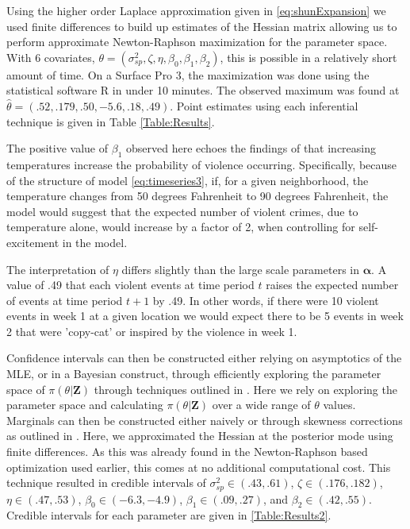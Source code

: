 \documentclass[11pt]{isuthesis}
\begin{document}
	Using the higher order Laplace approximation given in \eqref{eq:shunExpansion} we used finite differences to build up estimates of the Hessian matrix allowing us to perform approximate Newton-Raphson maximization for the parameter space.  With 6 covariates, $\theta = (\sigma_{sp}^2,\zeta,\eta,\beta_0,\beta_1,\beta_2)$, this is possible in a relatively short amount of time.  On a Surface Pro 3, the maximization was done using the statistical software R in under 10 minutes.  The observed maximum was found at $\hat{\theta}=(.52,.179,.50,-5.6,.18,.49)$.  Point estimates using each inferential technique is given in Table \ref{Table:Results}. 
	
	The positive value of $\beta_1$ observed here echoes the findings of \cite{anderson1987temperature} that increasing temperatures increase the probability of violence occurring.  Specifically, because of the structure of model \eqref{eq:timeseries3}, 
	if, for a given neighborhood, the temperature changes from 50 degrees Fahrenheit to 90 degrees Fahrenheit, the model would suggest that the expected number of violent crimes, due to temperature alone, would increase by a factor of 2, when controlling for self-excitement in the model.  
	
	The interpretation of $\eta$ differs slightly than the large scale parameters in $\boldsymbol{\alpha}$.  A value of .49 that each violent events at time period $t$ raises the expected number of events at time period $t+1$ by .49.  In other words, if there were 10 violent events in week 1 at a given location we would expect there to be 5 events in week 2 that were 'copy-cat' or inspired by the violence in week 1.
	
	Confidence intervals can then be constructed either relying on asymptotics of the MLE, or in a Bayesian construct, through efficiently exploring the parameter space of $\pi(\theta|\boldsymbol{Z})$ through techniques outlined in \cite{rue2009approximate}.  Here we rely on exploring the parameter space and calculating $\pi(\theta|\boldsymbol{Z})$ over a wide range of $\theta$ values.  Marginals can then be constructed either naively or through skewness corrections as outlined in \cite{martins2013bayesian}.  Here, we approximated the Hessian at the posterior mode using finite differences.  As this was already found in the Newton-Raphson based optimization used earlier, this comes at no additional computational cost. This technique resulted in credible intervals of $\sigma_{sp}^2 \in (.43,.61)$, $\zeta \in (.176,.182)$, $\eta \in (.47,.53)$, $\beta_0 \in (-6.3,-4.9)$, $\beta_1 \in (.09,.27)$, and $\beta_2 \in (.42,.55)$.  Credible intervals for each parameter are given in \ref{Table:Results2}.
	
\end{document}
